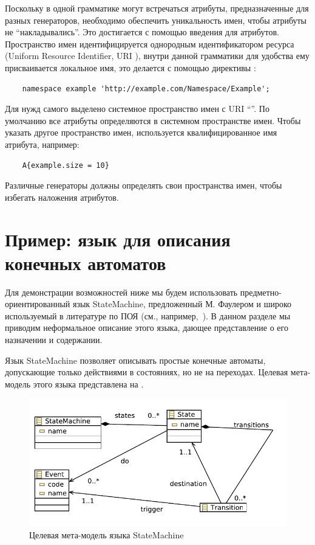 Поскольку в одной грамматике могут встречаться атрибуты, предназначенные для разных генераторов, необходимо обеспечить уникальность имен, чтобы атрибуты не ``накладывались''. Это достигается с помощью введения  для атрибутов. Пространство имен идентифицируется однородным идентификатором ресурса (Uniform Resource Identifier, URI \cite{uri}), внутри данной грамматики для удобства ему присваивается локальное имя, это делается с помощью директивы :
\begin{lstlisting}
	namespace example 'http://example.com/Namespace/Example';
\end{lstlisting}
Для нужд самого  выделено системное пространство имен  с URI ``''. По умолчанию все атрибуты определяются в системном пространстве имен. Чтобы указать другое пространство имен, используется квалифицированное имя атрибута, например:
\begin{lstlisting}
	A{example.size = 10}
\end{lstlisting}
Различные генераторы должны определять свои пространства имен, чтобы избегать наложения атрибутов.

\section{Пример: язык для описания конечных автоматов}

Для демонстрации возможностей  ниже мы будем использовать предметно-ориентированный язык StateMachine, предложенный М. Фаулером \cite{StateMachine} и широко используемый в литературе по ПОЯ (см., например,~\cite{Zdun}). В данном разделе мы приводим неформальное описание этого языка, дающее представление о его назначении и содержании.

Язык StateMachine позволяет описывать простые конечные автоматы, допускающие только действиями в состояниях, но не на переходах. Целевая мета-модель этого языка представлена на .

\begin{figure}[htbp]
	\centering
	\includegraphics[width=.6\textwidth]{statemachine.pdf}
	\caption{Целевая мета-модель языка StateMachine}\label{SMMM}
\end{figure}

